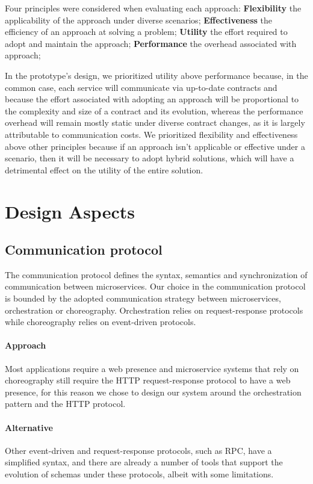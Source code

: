 Four principles were considered when evaluating each approach:
\textbf{Flexibility} the applicability of the approach under diverse scenarios;
\textbf{Effectiveness} the efficiency of an approach at solving a problem;
\textbf{Utility} the effort required to adopt and maintain the approach;
\textbf{Performance} the overhead associated with approach;

In the prototype's design, we prioritized utility above performance because,
in the common case, each service will communicate via up-to-date contracts and
because the effort associated with adopting an approach will be proportional to the complexity and size of a contract and its evolution,
whereas the performance overhead will remain mostly static under diverse contract changes, as it is largely attributable to communication costs.
We prioritized flexibility and effectiveness above other principles because if an approach isn't applicable or effective under a scenario,
then it will be necessary to adopt hybrid solutions, which will have a detrimental effect on the utility of the entire solution.

\section{Design Aspects} %
\label{sec:design_aspects}

\subsection{Communication protocol} %
\label{sec:communication_protocol}

The communication protocol defines the syntax, semantics and synchronization of communication between microservices.
Our choice in the communication protocol is bounded by the adopted communication strategy between microservices, orchestration or choreography.
Orchestration relies on request-response protocols while choreography relies on event-driven protocols.

\paragraph{Approach}
Most applications require a web presence and microservice systems that
rely on choreography still require the HTTP request-response protocol to have a web presence,
for this reason we chose to design our system around the orchestration pattern and the HTTP protocol.

\paragraph{Alternative}
Other event-driven and request-response protocols, such as RPC, have a simplified
syntax, and there are already a number of tools that support the evolution of schemas
under these protocols, albeit with some limitations.

